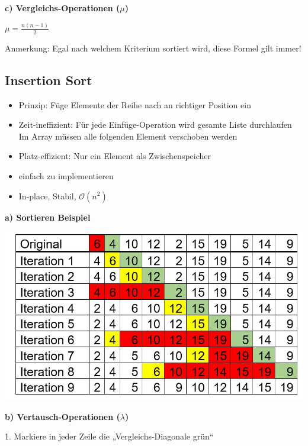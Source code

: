 \documentclass[12pt]{article}
\begin{document}
		\pagebreak
	\textbf{c) Vergleichs-Operationen ($\mu$)}
	\newline
	\newline
	
	
	\begin{center}
		$\mu = $\Large{$\frac{n(n-1)}{2}$}
	\end{center}
	
	Anmerkung: Egal nach welchem Kriterium sortiert wird, diese Formel gilt immer!
	
	\pagebreak
	
	
	\subsection{Insertion Sort}
	
	\begin{itemize}
		\item Prinzip: Füge Elemente der Reihe nach an richtiger Position ein
		\item Zeit-ineffizient:
			\subitem Für jede Einfüge-Operation wird gesamte Liste durchlaufen
			\subitem Im Array müssen alle folgenden Element verschoben werden
		\item Platz-effizient: Nur ein Element als Zwischenspeicher
		\item einfach zu implementieren
		\item In-place, Stabil, $ \mathcal{O}(n^2) $ 
		
	\end{itemize}
	\textbf{a) Sortieren Beispiel}
	
	\includegraphics[scale=0.5]{InsertionSort}
	\hfill \break
	
	\textbf{b) Vertausch-Operationen ($\lambda$)} \hfill \break
	
	1.	Markiere in jeder Zeile die „Vergleichs-Diagonale grün“
	
\end{document}
